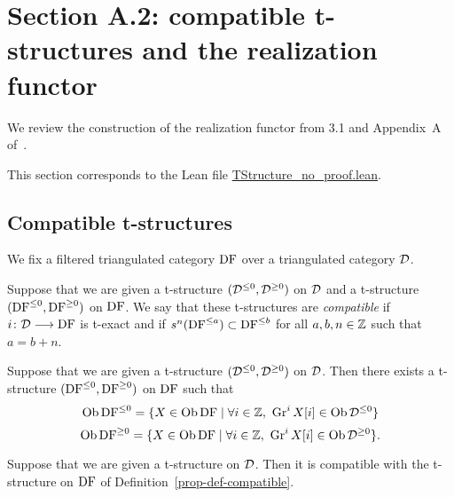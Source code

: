 \section{Section A.2: compatible t-structures and the realization functor}

We review the construction of the realization functor from \cite{BBD} 3.1 and Appendix~A of~\cite{Be1}.

This section corresponds to the Lean file \url{TStructure_no_proof.lean}.

\subsection{Compatible t-structures}

We fix a filtered triangulated category $\operatorname{DF}$ over a triangulated category $\mathcal{D}$.

\begin{definition}
\label{def-compatible}
\leanok
{}
Suppose that we are given
a t-structure $(\mathcal{D}^{\leq 0},\mathcal{D}^{\geq 0})$ on $\mathcal{D}$ and a t-structure $(\operatorname{DF}^{\leq 0},\operatorname{DF}^{\geq 0})$ on $\operatorname{DF}$.
We say that these t-structures are \emph{compatible} if $i\colon \mathcal{D}\longrightarrow\operatorname{DF}$ is t-exact and if $s^n(\operatorname{DF}^{\leq a})\subset\operatorname{DF}^{\leq b}$
for all $a,b,n\in\mathbb{Z}$ such that $a = b + n$.

\end{definition}

\begin{definition}
\label{prop-def-compatible}
\leanok
{}
Suppose that we are given
a t-structure $(\mathcal{D}^{\leq 0},\mathcal{D}^{\geq 0})$ on $\mathcal{D}$.
Then there exists a t-structure $(\operatorname{DF}^{\leq 0},\operatorname{DF}^{\geq 0})$ on $\operatorname{DF}$ such that 
\[\Ob\DF^{\leq 0}=\{X\in\Ob\DF\mid \forall i\in\Z,\ \Gra^i X[i]\in\Ob\Df^{\leq 0}\}\]
\[\Ob\DF^{\geq 0}=\{X\in\Ob\DF\mid \forall i\in\Z,\ \Gra^i X[i]\in\Ob\Df^{\geq 0}\}.\]

\end{definition}

\begin{proposition}
\label{prop-compatible}
\leanok
{}
Suppose that we are given
a t-structure on $\mathcal{D}$. Then it is compatible with the t-structure on $\operatorname{DF}$ 
of Definition~\ref{prop-def-compatible}.

\end{proposition}

